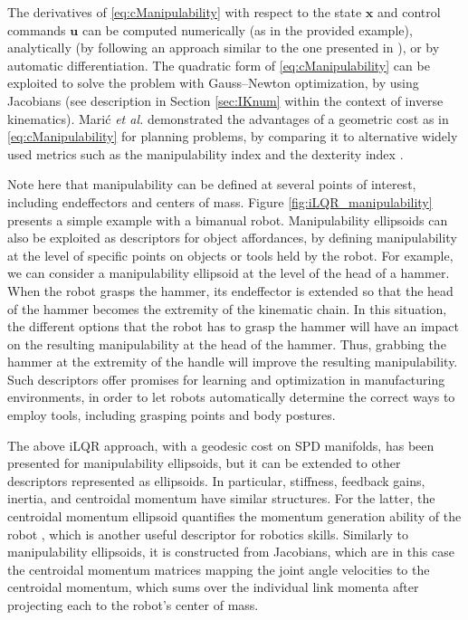 \documentclass[10pt,a4paper]{article} %
\begin{document}
The derivatives of \eqref{eq:cManipulability} with respect to the state $\bm{x}$ and control commands $\bm{u}$ can be computed numerically (as in the provided example), analytically (by following an approach similar to the one presented in \cite{Jaquier21IJRR}), or by automatic differentiation. The quadratic form of \eqref{eq:cManipulability} can be exploited to solve the problem with Gauss--Newton optimization, by using Jacobians (see description in Section \ref{sec:IKnum} within the context of inverse kinematics). Mari\'c \emph{et al.} demonstrated the advantages of a geometric cost as in \eqref{eq:cManipulability} for planning problems, by comparing it to alternative widely used metrics such as the manipulability index and the dexterity index \cite{Maric21}.

Note here that manipulability can be defined at several points of interest, including endeffectors and centers of mass. Figure \ref{fig:iLQR_manipulability} presents a simple example with a bimanual robot. Manipulability ellipsoids can also be exploited as descriptors for object affordances, by defining manipulability at the level of specific points on objects or tools held by the robot. For example, we can consider a manipulability ellipsoid at the level of the head of a hammer. When the robot grasps the hammer, its endeffector is extended so that the head of the hammer becomes the extremity of the kinematic chain. In this situation, the different options that the robot has to grasp the hammer will have an impact on the resulting manipulability at the head of the hammer. Thus, grabbing the hammer at the extremity of the handle will improve the resulting manipulability. Such descriptors offer promises for learning and optimization in manufacturing environments, in order to let robots automatically determine the correct ways to employ tools, including grasping points and body postures. 

The above iLQR approach, with a geodesic cost on SPD manifolds, has been presented for manipulability ellipsoids, but it can be extended to other descriptors represented as ellipsoids. In particular, stiffness, feedback gains, inertia, and centroidal momentum have similar structures. For the latter, the centroidal momentum ellipsoid quantifies the momentum generation ability of the robot \cite{Orin08}, which is another useful descriptor for robotics skills. Similarly to manipulability ellipsoids, it is constructed from Jacobians, which are in this case the centroidal momentum matrices mapping the joint angle velocities to the centroidal momentum, which sums over the individual link momenta after projecting each to the robot's center of mass.
\end{document}
